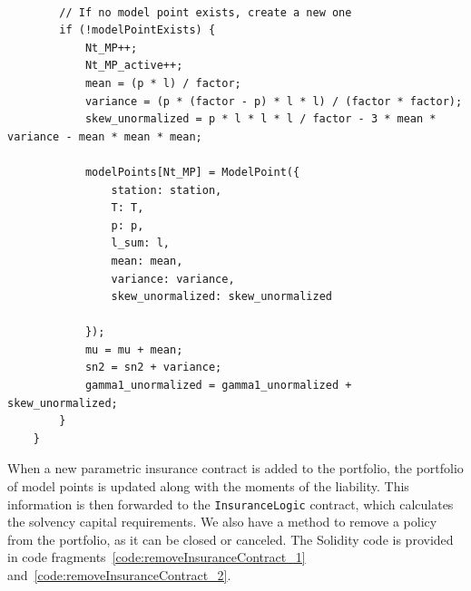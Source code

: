 \documentclass[10pt]{article}
\begin{document}
\begin{codefragment}[!h]
\begin{lstlisting}[language=Solidity]

        // If no model point exists, create a new one
        if (!modelPointExists) {
            Nt_MP++;
            Nt_MP_active++;
            mean = (p * l) / factor;
            variance = (p * (factor - p) * l * l) / (factor * factor);
            skew_unormalized = p * l * l * l / factor - 3 * mean * variance - mean * mean * mean;
            
            modelPoints[Nt_MP] = ModelPoint({
                station: station,
                T: T,
                p: p,
                l_sum: l, 
                mean: mean,
                variance: variance,
                skew_unormalized: skew_unormalized
            
            });
            mu = mu + mean;
            sn2 = sn2 + variance;
            gamma1_unormalized = gamma1_unormalized + skew_unormalized;
        }
    }

        \end{lstlisting}
    \caption{Part 3 of \texttt{addInsuranceContract} method.}
    \label{code:addInsuranceContract_3}
\end{codefragment}

When a new parametric insurance contract is added to the portfolio, the portfolio of model points is updated along with the moments of the liability. This information is then forwarded to the \texttt{InsuranceLogic} contract, which calculates the solvency capital requirements. We also have a method to remove a policy from the portfolio, as it can be closed or canceled. The Solidity code is provided in code fragments~\ref{code:removeInsuranceContract_1} and~\ref{code:removeInsuranceContract_2}.
\end{document}
